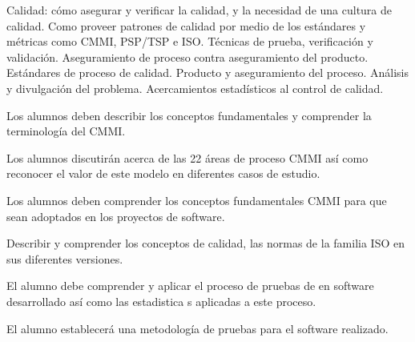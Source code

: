 \begin{syllabus}


\begin{justification}
Calidad: cómo asegurar y verificar la calidad, y la necesidad de una cultura de calidad. Como proveer patrones de
calidad por medio de los estándares y métricas como CMMI, PSP/TSP e ISO. Técnicas de prueba, verificación y validación.
Aseguramiento de proceso contra aseguramiento del producto. Estándares de proceso de calidad. Producto y
aseguramiento del proceso. Análisis y divulgación del problema. Acercamientos estadísticos al control de calidad.
\end{justification}

\begin{goals}
\item Los alumnos deben describir los conceptos fundamentales  y comprender la terminología del CMMI.
\item Los alumnos discutirán acerca de las 22 áreas de proceso CMMI así como reconocer el valor de este modelo en diferentes casos de estudio.
\item Los alumnos deben comprender los conceptos fundamentales  CMMI para que sean adoptados en los proyectos de software.
\item Describir y comprender los conceptos de calidad, las normas de la familia ISO en sus diferentes versiones.
\item El alumno debe comprender y aplicar el proceso de pruebas de en software desarrollado así como las estadistica s aplicadas a este proceso.
\item El alumno establecerá una metodología de pruebas para el software realizado.
\end{goals}

\begin{outcomes}
\end{outcomes}


\end{syllabus}
